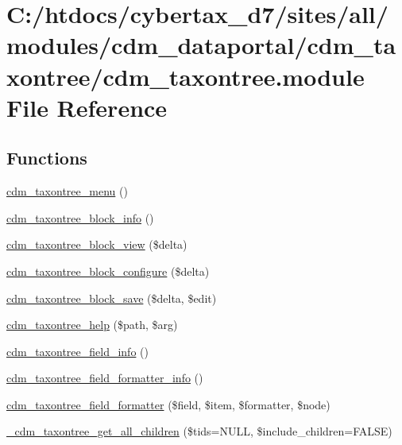 \hypertarget{cdm__taxontree_8module}{\section{C\-:/htdocs/cybertax\-\_\-d7/sites/all/modules/cdm\-\_\-dataportal/cdm\-\_\-taxontree/cdm\-\_\-taxontree.module File Reference}
\label{cdm__taxontree_8module}
}
\subsection*{Functions}
\begin{DoxyCompactItemize}
\item 
\hyperlink{cdm__taxontree_8module_a715d27e3777e87c5377f547b8a4cf3af}{cdm\-\_\-taxontree\-\_\-menu} ()
\item 
\hyperlink{cdm__taxontree_8module_a8b3c2d964b5997a7d583d00bd62c5d15}{cdm\-\_\-taxontree\-\_\-block\-\_\-info} ()
\item 
\hyperlink{cdm__taxontree_8module_a241252a088bf7b3d14d1dd3738a4473d}{cdm\-\_\-taxontree\-\_\-block\-\_\-view} (\$delta)
\item 
\hyperlink{cdm__taxontree_8module_a9485885802544ef1e1e6fd6bd50156f9}{cdm\-\_\-taxontree\-\_\-block\-\_\-configure} (\$delta)
\item 
\hyperlink{cdm__taxontree_8module_aa6040f86d5bd0a5346d757e596699293}{cdm\-\_\-taxontree\-\_\-block\-\_\-save} (\$delta, \$edit)
\item 
\hyperlink{cdm__taxontree_8module_a473bb9dae7d4537a4f5ea850262306ef}{cdm\-\_\-taxontree\-\_\-help} (\$path, \$arg)
\item 
\hyperlink{cdm__taxontree_8module_abe75837198efa44f395ca5d3e781db9f}{cdm\-\_\-taxontree\-\_\-field\-\_\-info} ()
\item 
\hyperlink{cdm__taxontree_8module_a2bf5ad66364ed928feb6e4fe9182e23c}{cdm\-\_\-taxontree\-\_\-field\-\_\-formatter\-\_\-info} ()
\item 
\hyperlink{cdm__taxontree_8module_a1f28d5613d99adfc85cb585cf6bb4340}{cdm\-\_\-taxontree\-\_\-field\-\_\-formatter} (\$field, \$item, \$formatter, \$node)
\item 
\hyperlink{cdm__taxontree_8module_a45835ee3fcd74c676c2a09cc08ef6d58}{\-\_\-cdm\-\_\-taxontree\-\_\-get\-\_\-all\-\_\-children} (\$tids=N\-U\-L\-L, \$include\-\_\-children=F\-A\-L\-S\-E)

\end{DoxyCompactItemize}
